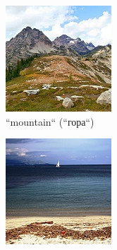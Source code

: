 \begin{figure}[htbp]
  \begin{subfigure}[b]{0.3\textwidth}
    \centering
    \includegraphics[width=\textwidth]{images/research/dataset/mountain.jpg}
    \caption{``mountain`` (``гора``)}
    \label{fig:intel-multiclass-mountain}
  \end{subfigure}
  \begin{subfigure}[b]{0.3\textwidth}
    \centering
    \includegraphics[width=\textwidth]{images/research/dataset/sea.jpg}

\end{subfigure}
\end{figure}
